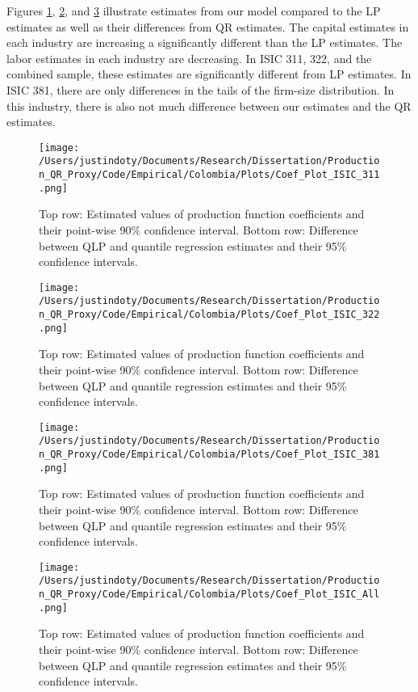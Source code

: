 \documentclass[11pt]{article}
\begin{document}
Figures \ref{fig:COL311}, \ref{fig:COL321}, and \ref{fig:COL381} illustrate estimates from our model compared to the LP estimates as well as their differences from QR estimates. The capital estimates in each industry are increasing a significantly different than the LP estimates. The labor estimates in each industry are decreasing. In ISIC 311, 322, and the combined sample, these estimates are significantly different from LP estimates. In ISIC 381, there are only differences in the tails of the firm-size distribution. In this industry, there is also not much difference between our estimates and the QR estimates.

\begin{figure}[H]
\centering
\texttt{[image: /Users/justindoty/Documents/Research/Dissertation/Production\_QR\_Proxy/Code/Empirical/Colombia/Plots/Coef\_Plot\_ISIC\_311.png]}
\caption{Top row: Estimated values of production function coefficients and their point-wise 90\% confidence interval. Bottom row: Difference between QLP and quantile regression estimates and their 95\% confidence intervals.}
\label{fig:COL311}
\end{figure}

\begin{figure}[H]
\centering
\texttt{[image: /Users/justindoty/Documents/Research/Dissertation/Production\_QR\_Proxy/Code/Empirical/Colombia/Plots/Coef\_Plot\_ISIC\_322.png]}
\caption{Top row: Estimated values of production function coefficients and their point-wise 90\% confidence interval. Bottom row: Difference between QLP and quantile regression estimates and their 95\% confidence intervals.}
\label{fig:COL321}
\end{figure}

\begin{figure}[H]
\centering
\texttt{[image: /Users/justindoty/Documents/Research/Dissertation/Production\_QR\_Proxy/Code/Empirical/Colombia/Plots/Coef\_Plot\_ISIC\_381.png]}
\caption{Top row: Estimated values of production function coefficients and their point-wise 90\% confidence interval. Bottom row: Difference between QLP and quantile regression estimates and their 95\% confidence intervals.}
\label{fig:COL381}
\end{figure}

\begin{figure}[H]
\centering
\texttt{[image: /Users/justindoty/Documents/Research/Dissertation/Production\_QR\_Proxy/Code/Empirical/Colombia/Plots/Coef\_Plot\_ISIC\_All.png]}
\caption{Top row: Estimated values of production function coefficients and their point-wise 90\% confidence interval. Bottom row: Difference between QLP and quantile regression estimates and their 95\% confidence intervals.}
\label{fig:COLall}
\end{figure}
\end{document}
